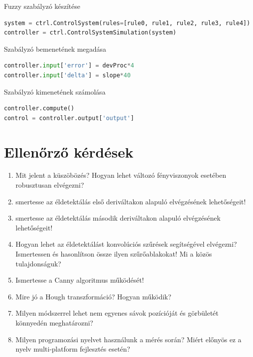 \documentclass[12pt,a4paper,oneside]{report}             %
\begin{document}
Fuzzy szabályzó készítése

\begin{lstlisting}[language=Python]
system = ctrl.ControlSystem(rules=[rule0, rule1, rule2, rule3, rule4])
controller = ctrl.ControlSystemSimulation(system)
\end{lstlisting}

Szabályzó bemenetének megadása

\begin{lstlisting}[language=Python]
controller.input['error'] = devProc*4
controller.input['delta'] = slope*40
\end{lstlisting}

Szabályzó kimenetének számolása

\begin{lstlisting}[language=Python]
controller.compute()
control = controller.output['output']
\end{lstlisting}

\chapter{Ellenőrző kérdések}

\begin{enumerate}
\item Mit jelent a küszöbözés? Hogyan lehet változó fényviszonyok esetében robusztusan elvégezni?
\item smertesse az éldetektálás első deriváltakon alapuló elvégzésének lehetőségeit!
\item smertesse az éldetektálás második deriváltakon alapuló elvégzésének lehetőségeit!
\item Hogyan lehet az éldetektálást konvolúciós szűrések segítségével elvégezni? Ismertessen és hasonlítson össze ilyen szűrőablakokat! Mi a közös tulajdonságuk?
\item Ismertesse a Canny algoritmus működését!
\item Mire jó a Hough transzformáció? Hogyan működik?
\item Milyen módszerrel lehet nem egyenes sávok pozícióját és görbületét könnyedén meghatározni?
\item Milyen programozási nyelvet használunk a mérés során? Miért előnyös ez a nyelv multi-platform fejlesztés esetén?
\end{enumerate}

\printbibliography
\end{document}
